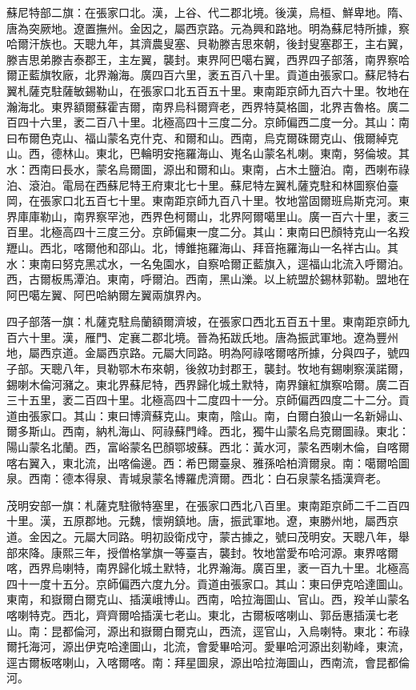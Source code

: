 \begin{pinyinscope}
蘇尼特部二旗：在張家口北。漢，上谷、代二郡北境。後漢，烏桓、鮮卑地。隋、唐為突厥地。遼置撫州。金因之，屬西京路。元為興和路地。明為蘇尼特所據，察哈爾汗族也。天聰九年，其濟農叟塞、貝勒滕吉思來朝，後封叟塞郡王，主右翼，滕吉思弟滕吉泰郡王，主左翼，襲封。東界阿巴噶右翼，西界四子部落，南界察哈爾正藍旗牧廠，北界瀚海。廣四百六里，袤五百八十里。貢道由張家口。蘇尼特右翼札薩克駐薩敏錫勒山，在張家口北五百五十里。東南距京師九百六十里。牧地在瀚海北。東界額爾蘇霍吉爾，南界烏科爾齊老，西界特莫格圖，北界吉魯格。廣二百四十六里，袤二百八十里。北極高四十三度二分。京師偏西二度一分。其山：南曰布爾色克山、福山蒙名克什克、和爾和山。西南，烏克爾硃爾克山、俄爾綽克山。西，德林山。東北，巴輪明安拖羅海山、嵬名山蒙名札喇。東南，努倫坡。其水：西南曰長水，蒙名烏爾圖，源出和爾和山。東南，占木土鹽泊。南，西喇布祿泊、滾泊。電局在西蘇尼特王府東北七十里。蘇尼特左翼札薩克駐和林圖察伯臺岡，在張家口北五百七十里。東南距京師九百八十里。牧地當固爾班烏斯克河。東界庫庫勒山，南界察罕池，西界色柯爾山，北界阿爾噶里山。廣一百六十里，袤三百里。北極高四十三度三分。京師偏東一度二分。其山：東南曰巴顏特克山一名羖䍽山。西北，喀爾他和邵山。北，博錐拖羅海山、拜音拖羅海山一名祥古山。其水：東南曰努克黑忒水，一名兔園水，自察哈爾正藍旗入，逕福山北流入呼爾泊。西，古爾板馬潭泊。東南，呼爾泊。西南，黑山濼。以上統盟於錫林郭勒。盟地在阿巴噶左翼、阿巴哈納爾左翼兩旗界內。

四子部落一旗：札薩克駐烏蘭額爾濟坡，在張家口西北五百五十里。東南距京師九百六十里。漢，雁門、定襄二郡北境。晉為拓跋氏地。唐為振武軍地。遼為豐州地，屬西京道。金屬西京路。元屬大同路。明為阿祿喀爾喀所據，分與四子，號四子部。天聰八年，貝勒鄂木布來朝，後敘功封郡王，襲封。牧地有錫喇察漢諾爾，錫喇木倫河瀦之。東北界蘇尼特，西界歸化城土默特，南界鑲紅旗察哈爾。廣二百三十五里，袤二百四十里。北極高四十二度四十一分。京師偏西四度二十二分。貢道由張家口。其山：東曰博濟蘇克山。東南，陰山。南，白爾白狼山一名新婦山、爾多斯山。西南，納札海山、阿祿蘇門峰。西北，獨牛山蒙名烏克爾圖祿。東北：陽山蒙名北蘭。西，富峪蒙名巴顏鄂坡蘇。西北：黃水河，蒙名西喇木倫，自喀爾喀右翼入，東北流，出喀倫邊。西：希巴爾臺泉、雅孫哈柏濟爾泉。南：噶爾哈圖泉。西南：德本得泉、青堿泉蒙名博羅虎濟爾。西北：白石泉蒙名插漢齊老。

茂明安部一旗：札薩克駐徹特塞里，在張家口西北八百里。東南距京師二千二百四十里。漢，五原郡地。元魏，懷朔鎮地。唐，振武軍地。遼，東勝州地，屬西京道。金因之。元屬大同路。明初設衛戍守，蒙古據之，號曰茂明安。天聰八年，舉部來降。康熙三年，授僧格掌旗一等臺吉，襲封。牧地當愛布哈河源。東界喀爾喀，西界烏喇特，南界歸化城土默特，北界瀚海。廣百里，袤一百九十里。北極高四十一度十五分。京師偏西六度九分。貢道由張家口。其山：東曰伊克哈達圖山。東南，和嶽爾白爾克山、插漢峨博山。西南，哈拉海圖山、官山。西，羖羊山蒙名喀喇特克。西北，齊齊爾哈插漢七老山。東北，古爾板喀喇山、郭岳惠插漢七老山。南：昆都倫河，源出和嶽爾白爾克山，西流，逕官山，入烏喇特。東北：布祿爾托海河，源出伊克哈達圖山，北流，會愛畢哈河。愛畢哈河源出刻勒峰，東流，逕古爾板喀喇山，入喀爾喀。南：拜星圖泉，源出哈拉海圖山，西南流，會昆都倫河。


\end{pinyinscope}

